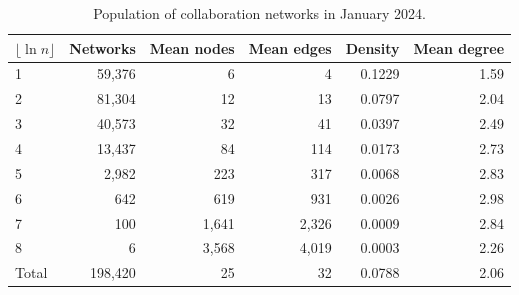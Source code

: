 \begin{table}[tbp]
\centering
\caption{Population of collaboration networks in January 2024.}\label{tab:ch6-population}
\fontsize{9.5}{12}\selectfont
\renewcommand{\arraystretch}{1.13}
\begin{tabular*}{\textwidth}{@{}l@{\extracolsep{\fill}}rrrrr@{}}
\toprule
$\lfloor\ln n\rfloor$ & Networks & Mean nodes & Mean edges & Density & Mean degree\\
\midrule
1 & 59,376 & 6 & 4 & 0.1229 & 1.59\\
2 & 81,304 & 12 & 13 & 0.0797 & 2.04\\
3 & 40,573 & 32 & 41 & 0.0397 & 2.49\\
4 & 13,437 & 84 & 114 & 0.0173 & 2.73\\
5 & 2,982 & 223 & 317 & 0.0068 & 2.83\\
6 & 642 & 619 & 931 & 0.0026 & 2.98\\
7 & 100 & 1,641 & 2,326 & 0.0009 & 2.84\\
8 & 6 & 3,568 & 4,019 & 0.0003 & 2.26\\
Total & 198,420 & 25 & 32 & 0.0788 & 2.06\\
\bottomrule
\end{tabular*}
\end{table}
